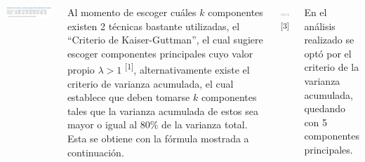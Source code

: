 \documentclass[a0paper,portrait,margin=0pt, colspace=24pt,subcolspace=0pt,blockverticalspace=36pt,innermargin=50pt]{tikzposter}
\begin{document}
\begin{columns}
{\centering

\includegraphics[scale=1.5]{Figures/analsisValoresVectores.png}

	\raggedright


Al momento de escoger cu\'{a}les $k$ componentes existen 2 t\'{e}cnicas bastante utilizadas, el ``Criterio de Kaiser-Guttman'', el cual sugiere escoger componentes principales cuyo valor propio $\lambda>1$ \textsuperscript{[1]}, alternativamente existe el criterio de varianza acumulada, el cual establece que deben tomarse $k$ componentes tales que la varianza acumulada de estos sea mayor o igual al 80\% de la varianza total. 
Esta se obtiene con la f\'{o}rmula mostrada a continuaci\'{o}n. 

\centering

\includegraphics[scale=2.5]{Figures/acumulada.png} \textsuperscript{[3]}


\raggedright


En el an\'{a}lisis realizado se opt\'{o} por el criterio de la varianza acumulada, quedando con 5 componentes principales.
}

%
%
%
%
\end{columns}
\end{document}
